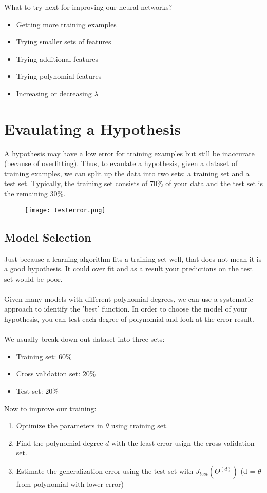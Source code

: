 What to try next for improving our neural networks?
\begin{itemize}
  \item Getting more training examples
  \item Trying smaller sets of features
  \item Trying additional features
  \item Trying polynomial features
  \item Increasing or decreasing $\lambda$
\end{itemize}

\section{Evaulating a Hypothesis}
A hypothesis may have a low error for training examples but still be inaccurate (because of overfitting). Thus, to evaulate a hypothesis, given a dataset of training examples, we can split up the data into two sets: a training set and a test set. Typically, the training set consists of $70\%$ of your data and the test set is the remaining $30\% $.

\begin{figure}[h]
  \texttt{[image: testerror.png]}
\end{figure}

\subsection{Model Selection}
  Just because a learning algorithm fits a training set well, that does not mean it is a good hypothesis. It could over fit and as a result your predictions on the test set would be poor.
  \\\\
  Given many models with different polynomial degrees, we can use a systematic approach to identify the 'best' function. In order to choose the model of your hypothesis, you can test each degree of polynomial and look at the error result.
  \\\\
  We usually break down out dataset into three sets:
  \begin{itemize}
    \item Training set: $60\%$
    \item Cross validation set: $20\%$
    \item Test set: $20\%$
  \end{itemize}


  Now to improve our training:
  \begin{enumerate}
    \item Optimize the parameters in $\theta$ using training set.
    \item Find the polynomial degree $d$ with the least error usign the cross validation set.
    \item Estimate the generalization error using the test set with $J_{test}(\Theta^{(d)})$ (d = $\theta$ from polynomial with lower error)
  \end{enumerate}

